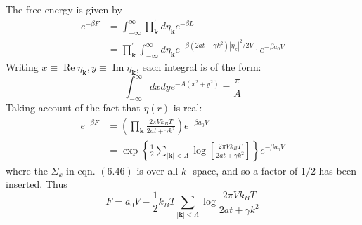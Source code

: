 \documentclass[12pt,titlepage]{article}
\numberwithin{equation}{section}
\begin{document}
The free energy is given by
\begin{equation}
\begin{aligned} e^{-\beta F} &=\int_{-\infty}^{\infty} \prod_{\mathbf{k}}^{\prime} d \eta_{\mathbf{k}} e^{-\beta L} \\ &=\prod_{\mathbf{k}}^{\prime} \int_{-\infty}^{\infty} d \eta_{\mathbf{k}} e^{-\beta\left(2 a t+\gamma k^{2}\right)|\eta_k |^{2} / 2 V} \cdot e^{-\beta a_{0} V} \end{aligned}
\end{equation}
Writing $x \equiv \operatorname{Re} \eta_{\mathbf{k}}, y \equiv \operatorname{Im} \eta_{\mathbf{k}}$, each integral is of the form:
\begin{equation}
\int_{-\infty}^{\infty} d x d y e^{-A\left(x^{2}+y^{2}\right)}=\frac{\pi}{A}
\end{equation}
Taking account of the fact that $\eta(r)$ is real:
\begin{equation}
\begin{aligned} e^{-\beta F} &=\left(\prod_{\mathbf{k}} \frac{2 \pi V k_{B} T}{2 a t+\gamma k^{2}}\right) e^{-\beta a_{0} V} \\ &=\exp \left\{\frac{1}{2} \sum_{|\mathbf{k}|<\Lambda} \log \left[\frac{2 \pi V k_{B} T}{2 a t+\gamma k^{2}}\right]\right\} e^{-\beta a_{0} V} \end{aligned}
\end{equation}
where the $\Sigma_{k}$ in eqn. $(6.46)$ is over all $k$ -space, and so a factor of 1$/ 2$ has been inserted. Thus
\begin{equation}
F=a_{0} V-\frac{1}{2} k_{B} T \sum_{|\mathbf{k}|<\Lambda} \log \frac{2 \pi V k_{B} T}{2 a t+\gamma k^{2}}
\end{equation}
\end{document}
